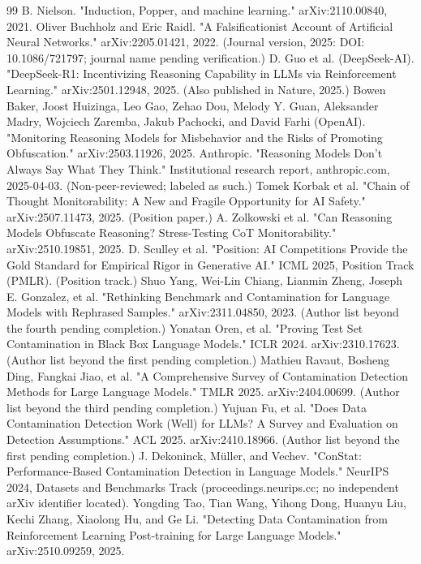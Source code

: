 \documentclass[11pt,a4paper]{article}
\begin{document}
\begin{thebibliography}{99}
 B. Nielson. "Induction, Popper, and machine learning." arXiv:2110.00840, 2021.
 Oliver Buchholz and Eric Raidl. "A Falsificationist Account of Artificial Neural Networks." arXiv:2205.01421, 2022. (Journal version, 2025: DOI: 10.1086/721797; journal name pending verification.)
 D. Guo et al. (DeepSeek-AI). "DeepSeek-R1: Incentivizing Reasoning Capability in LLMs via Reinforcement Learning." arXiv:2501.12948, 2025. (Also published in Nature, 2025.)
 Bowen Baker, Joost Huizinga, Leo Gao, Zehao Dou, Melody Y. Guan, Aleksander Madry, Wojciech Zaremba, Jakub Pachocki, and David Farhi (OpenAI). "Monitoring Reasoning Models for Misbehavior and the Risks of Promoting Obfuscation." arXiv:2503.11926, 2025.
 Anthropic. "Reasoning Models Don't Always Say What They Think." Institutional research report, anthropic.com, 2025-04-03. (Non-peer-reviewed; labeled as such.)
 Tomek Korbak et al. "Chain of Thought Monitorability: A New and Fragile Opportunity for AI Safety." arXiv:2507.11473, 2025. (Position paper.)
 A. Zolkowski et al. "Can Reasoning Models Obfuscate Reasoning? Stress-Testing CoT Monitorability." arXiv:2510.19851, 2025.
 D. Sculley et al. "Position: AI Competitions Provide the Gold Standard for Empirical Rigor in Generative AI." ICML 2025, Position Track (PMLR). (Position track.)
 Shuo Yang, Wei-Lin Chiang, Lianmin Zheng, Joseph E. Gonzalez, et al. "Rethinking Benchmark and Contamination for Language Models with Rephrased Samples." arXiv:2311.04850, 2023. (Author list beyond the fourth pending completion.)
 Yonatan Oren, et al. "Proving Test Set Contamination in Black Box Language Models." ICLR 2024. arXiv:2310.17623. (Author list beyond the first pending completion.)
 Mathieu Ravaut, Bosheng Ding, Fangkai Jiao, et al. "A Comprehensive Survey of Contamination Detection Methods for Large Language Models." TMLR 2025. arXiv:2404.00699. (Author list beyond the third pending completion.)
 Yujuan Fu, et al. "Does Data Contamination Detection Work (Well) for LLMs? A Survey and Evaluation on Detection Assumptions." ACL 2025. arXiv:2410.18966. (Author list beyond the first pending completion.)
 J. Dekoninck, Müller, and Vechev. "ConStat: Performance-Based Contamination Detection in Language Models." NeurIPS 2024, Datasets and Benchmarks Track (proceedings.neurips.cc; no independent arXiv identifier located).
 Yongding Tao, Tian Wang, Yihong Dong, Huanyu Liu, Kechi Zhang, Xiaolong Hu, and Ge Li. "Detecting Data Contamination from Reinforcement Learning Post-training for Large Language Models." arXiv:2510.09259, 2025.

\end{thebibliography}
\end{document}
